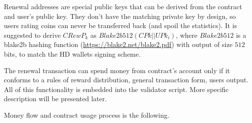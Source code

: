 \documentclass[]{itmo-student-thesis}
\begin{document}
Renewal addresses are special public keys that can be derived from the
contract and user’s public key. They don’t have the matching private
key by design, so users rating coins can never be transferred back
(and spoil the statistics). It is suggested to derive $CRewP_k$ as
$Blake2b512(CPk || UPk_i)$, where $Blake2b512$ is a blake2b hashing
function (\url{https://blake2.net/blake2.pdf}) with output of size
$512$ bits, to match the HD wallets signing scheme.

The renewal transaction can spend money from contract’s account only
if it conforms to a rules of reward distribution, general transaction
form, users output. All of this functionality is embedded into the
validator script. More specific description will be presented later.

Money flow and contract usage process is the following.
\end{document}
